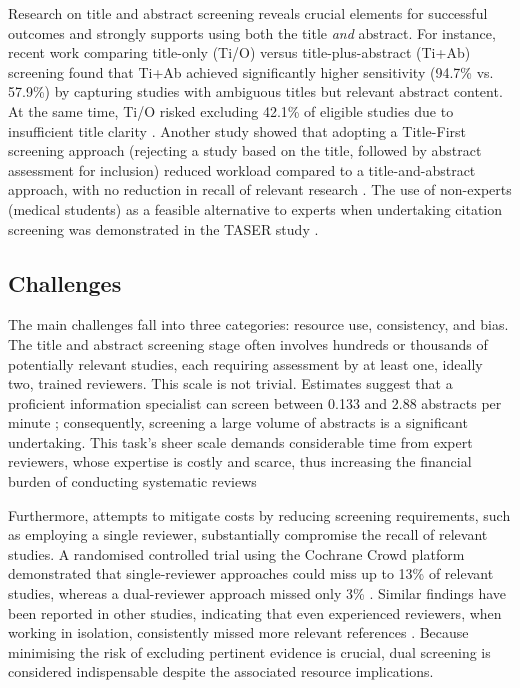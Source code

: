 \documentclass[10pt,oneside]{book}
\begin{document}
Research on title and abstract screening reveals crucial elements for successful outcomes and strongly supports using both the title \emph{and} abstract. For instance, recent work comparing title-only (Ti/O) versus title-plus-abstract (Ti+Ab) screening found that Ti+Ab achieved significantly higher sensitivity (94.7\% vs. 57.9\%) by capturing studies with ambiguous titles but relevant abstract content. At the same time, Ti/O risked excluding 42.1\% of eligible studies due to insufficient title clarity \cite{teo_title-plus-abstract_2023}. Another study showed that adopting a Title-First screening approach (rejecting a study based on the title, followed by abstract assessment for inclusion) reduced workload compared to a title-and-abstract approach, with no reduction in recall of relevant research \cite{mateen_titles_2013}. The use of non-experts (medical students) as a feasible alternative to experts when undertaking citation screening was demonstrated in the TASER study \cite{ng_title_2014}.


\subsection{Challenges}

The main challenges fall into three categories: resource use, consistency, and bias. The title and abstract screening stage often involves hundreds or thousands of potentially relevant studies, each requiring assessment by at least one, ideally two, trained reviewers. This scale is not trivial. Estimates suggest that a proficient information specialist can screen between 0.133 and 2.88 abstracts per minute \cite{shemilt_use_2016,giummarra_evaluation_2020,felizardo_visual_2013}; consequently, screening a large volume of abstracts is a significant undertaking. This task's sheer scale demands considerable time from expert reviewers, whose expertise is costly and scarce, thus increasing the financial burden of conducting systematic reviews

Furthermore, attempts to mitigate costs by reducing screening requirements, such as employing a single reviewer, substantially compromise the recall of relevant studies. A randomised controlled trial using the Cochrane Crowd platform demonstrated that single-reviewer approaches could miss up to 13\% of relevant studies, whereas a dual-reviewer approach missed only 3\% \cite{gartlehner_single-reviewer_2020}. Similar findings have been reported in other studies, indicating that even experienced reviewers, when working in isolation, consistently missed more relevant references \cite{waffenschmidt_single_2019}. Because minimising the risk of excluding pertinent evidence is crucial, dual screening is considered indispensable despite the associated resource implications.
\end{document}

